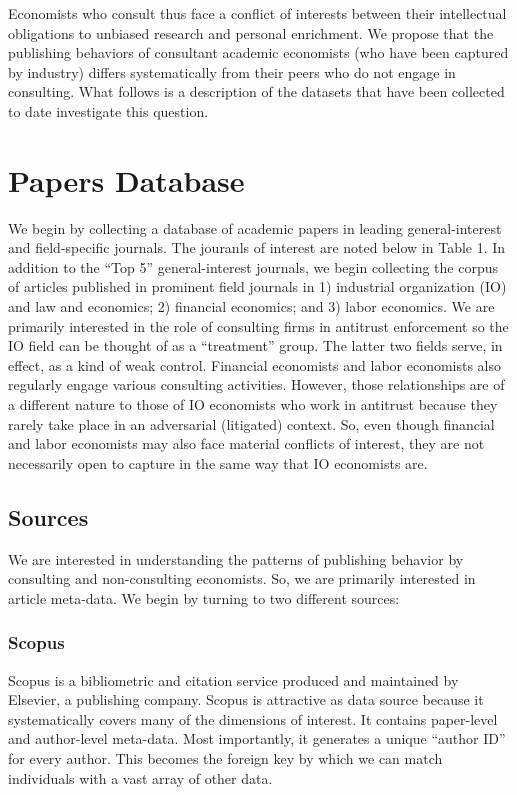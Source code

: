 \documentclass[11pt, letterpaper, twoside]{article}
\begin{document}
Economists who consult thus face a conflict of interests between their intellectual obligations to unbiased research and personal enrichment. We propose that the publishing behaviors of consultant academic economists (who have been captured by industry) differs systematically from their peers who do not engage in consulting. What follows is a description of the datasets that have been collected to date investigate this question.


\section{Papers Database}

We begin by collecting a database of academic papers in leading general-interest and field-specific journals. The jouranls of interest are noted below in Table 1. In addition to the ``Top 5'' general-interest journals, we begin collecting the corpus of articles published in prominent field journals in 1) industrial organization (IO) and law and economics; 2) financial economics; and 3) labor economics. We are primarily interested in the role of consulting firms in antitrust enforcement so the IO field can be thought of as a ``treatment'' group. The latter two fields serve, in effect, as a kind of weak control. Financial economists and labor economists also regularly engage various consulting activities. However, those relationships are of a different nature to those of IO economists who work in antitrust because they rarely take place in an adversarial (litigated) context. So, even though financial and labor economists may also face material conflicts of interest, they are not necessarily open to capture in the same way that IO economists are. 



\subsection{Sources}
We are interested in understanding the patterns of publishing behavior by consulting and non-consulting economists. So, we are primarily interested in article meta-data. We begin by turning to two different sources:

\subsubsection{Scopus}
Scopus is a bibliometric and citation service produced and maintained by Elsevier, a publishing company. Scopus is attractive as data source because it systematically covers many of the dimensions of interest. It contains paper-level and author-level meta-data. Most importantly, it generates a unique ``author ID'' for every author. This becomes the foreign key by which we can match individuals with a vast array of other data.
\end{document}
